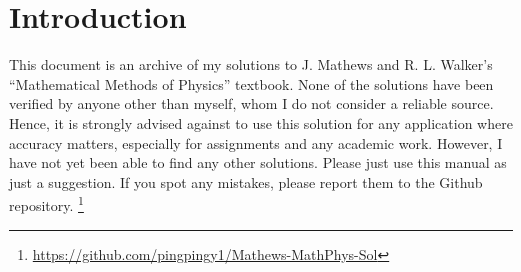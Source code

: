 \section{Introduction}

This document is an archive of my solutions to J. Mathews and R. L. Walker's ``Mathematical Methods of Physics'' textbook.
None of the solutions have been verified by anyone other than myself, whom I do not consider a reliable source.
Hence, it is strongly advised against to use this solution for any application where accuracy matters,
especially for assignments and any academic work.
However, I have not yet been able to find any other solutions.
Please just use this manual as just a suggestion.
If you spot any mistakes, please report them to the Github repository.
\footnote{\faGithubSquare{} \url{https://github.com/pingpingy1/Mathews-MathPhys-Sol}}